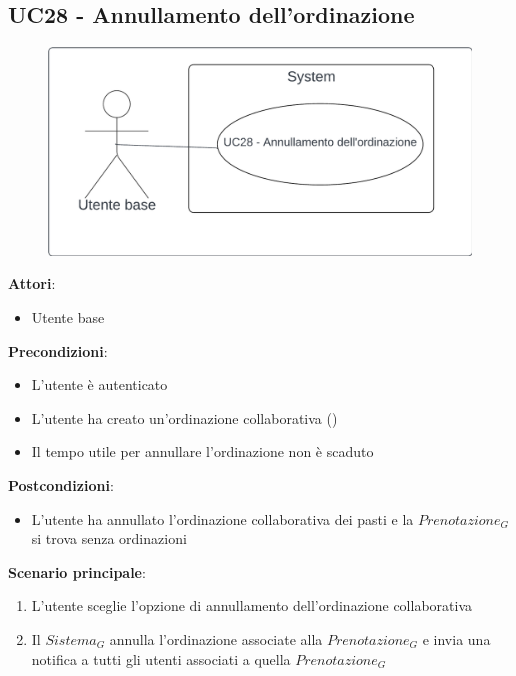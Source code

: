 \subsection{UC28 - Annullamento dell'ordinazione}\label{usecase:28}
\begin{figure}[H]
    \centering
    \includegraphics[width=0.9\linewidth]{ucd/UCD28.png}
\end{figure}
\textbf{Attori}:
\begin{itemize}
    \item Utente base
\end{itemize}
\textbf{Precondizioni}:
\begin{itemize}
    \item L'utente è autenticato
    \item L'utente ha creato un'ordinazione collaborativa ()
    \item Il tempo utile per annullare l'ordinazione non è scaduto
\end{itemize}
\textbf{Postcondizioni}:
\begin{itemize}
    \item L'utente ha annullato l'ordinazione collaborativa dei pasti e la $\textit{Prenotazione}_G$ si trova senza ordinazioni
\end{itemize}
\textbf{Scenario principale}:
\begin{enumerate}
    \item L'utente sceglie l'opzione di annullamento dell'ordinazione collaborativa
    \item Il $\textit{Sistema}_G$ annulla l'ordinazione associate alla $\textit{Prenotazione}_G$ e invia una notifica a tutti gli utenti associati a quella $\textit{Prenotazione}_G$
\end{enumerate}
\newpage